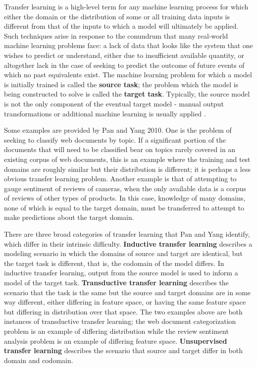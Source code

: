 Transfer learning is a high-level term for any machine learning process for which either the domain or the distribution of some or all training data inputs is different from that of the inputs to which a model will ultimately be applied. Such techniques arise in response to the conundrum that many real-world machine learning problems face: a lack of data that looks like the system that one wishes to predict or understand, either due to insufficient available quantity, or altogether lack in the case of seeking to predict the outcome of future events of which no past equivalents exist. The machine learning problem for which a model is initially trained is called the \textbf{source task}; the problem which the model is being constructed to solve is called the \textbf{target task}. Typically, the source model is not the only component of the eventual target model - manual output transformations or additional machine learning is usually applied \parencite{Pan2010}.

Some examples are provided by Pan and Yang 2010. One is the problem of seeking to classify web documents by topic. If a significant portion of the documents that will need to be classified bear on topics rarely covered in an existing corpus of web documents, this is an example where the training and test domains are roughly similar but their distribution is different; it is perhaps a less obvious transfer learning problem. Another example is that of attempting to gauge sentiment of reviews of cameras, when the only available data is a corpus of reviews of other types of products. In this case, knowledge of many domains, none of which is equal to the target domain, must be transferred to attempt to make predictions about the target domain.

There are three broad categories of transfer learning that Pan and Yang identify, which differ in their intrinsic difficulty. \textbf{Inductive transfer learning} describes a modeling scenario in which the domains of source and target are identical, but the target task is different, that is, the codomain of the model differs. In inductive transfer learning, output from the source model is used to inform a model of the target task. \textbf{Transductive transfer learning} describes the scenario that the task is the same but the source and target domains are in some way different, either differing in feature space, or having the same feature space but differing in distribution over that space. The two examples above are both instances of transductive transfer learning; the web document categorization problem is an example of differing distribution while the review sentiment analysis problem is an example of differing feature space. \textbf{Unsupervised transfer learning} describes the scenario that source and target differ in both domain and codomain. 

